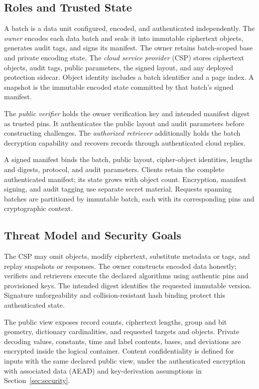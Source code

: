 \documentclass[10pt,journal]{IEEEtran}
\newcounter{algorithm}
\begin{document}
\subsection{Roles and Trusted State}
A batch is a data unit configured, encoded, and authenticated independently.
The \emph{owner} encodes each data batch and seals it into immutable ciphertext objects,
generates audit tags, and signs its manifest. The owner retains batch-scoped
base and private encoding state. The \emph{cloud service provider} (CSP)
stores ciphertext objects, audit tags, public parameters, the signed layout,
and any deployed protection sidecar. Object identity includes a batch
identifier and a page index. A snapshot is the immutable encoded state
committed by that batch's signed manifest.

The \emph{public verifier} holds the owner verification key and intended
manifest digest as trusted pins. It authenticates the public layout and
audit parameters before constructing challenges. The \emph{authorized
retriever} additionally holds the batch decryption capability and recovers
records through authenticated cloud replies.

A signed manifest binds the batch, public layout, cipher-object identities,
lengths and digests, protocol, and audit parameters. Clients retain the
complete authenticated manifest; its state grows with object count.
Encryption, manifest signing, and audit tagging use separate secret material.
Requests spanning batches are partitioned by immutable batch, each with its
corresponding pins and cryptographic context.

\subsection{Threat Model and Security Goals}
The CSP may omit objects, modify ciphertext, substitute metadata or tags,
and replay snapshots or responses. The owner constructs encoded data honestly;
verifiers and retrievers execute the declared algorithms using authentic
pins and provisioned keys. The intended digest identifies the requested
immutable version. Signature unforgeability and collision-resistant hash
binding protect this authenticated state.

The public view exposes record counts, ciphertext lengths, group and bit
geometry, dictionary cardinalities, and requested targets and objects.
Private decoding values, constants, time and label contents, bases, and
deviations are encrypted inside the logical container. Content confidentiality
is defined for inputs with the same declared public view, under the
authenticated encryption with associated data (AEAD)
and key-derivation assumptions in Section~\ref{sec:security}.
\end{document}
